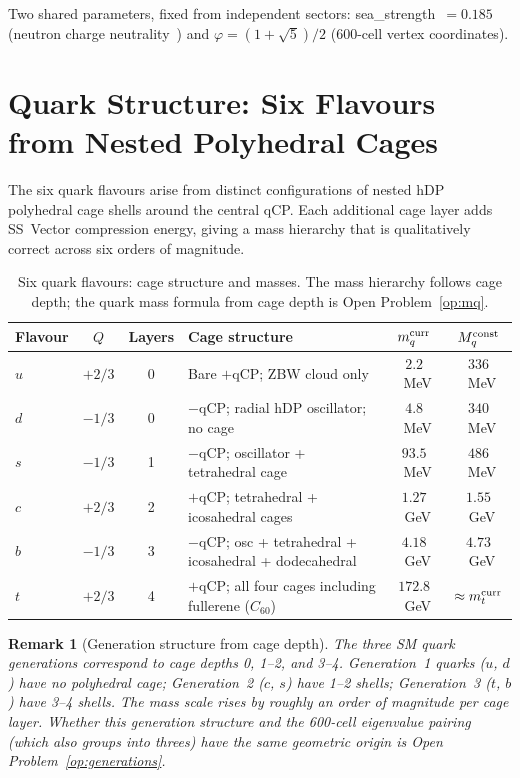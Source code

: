 \documentclass[11pt,a4paper]{article}
\newtheorem{remark}[theorem]{Remark}
\newcommand{\phig}{\varphi}
\begin{document}
Two shared parameters, fixed from independent sectors:
sea\_strength~$= 0.185$ (neutron charge neutrality~\citep{cpp5014})
and $\phig = (1+\sqrt5)/2$ (600-cell vertex coordinates).

\section{Quark Structure: Six Flavours from Nested Polyhedral Cages}
\label{sec:quarks}

The six quark flavours arise from distinct configurations of nested
hDP polyhedral cage shells around the central qCP.  Each additional
cage layer adds SS~Vector compression energy, giving a mass hierarchy
that is qualitatively correct across six orders of magnitude.

\begin{table}[H]
\centering
\caption{Six quark flavours: cage structure and masses.  The mass
  hierarchy follows cage depth; the quark mass formula from cage
  depth is Open Problem~\ref{op:mq}.}
\label{tab:quarks}
\begin{tabular}{@{}lccp{5.2cm}cc@{}}
\toprule
Flavour & $Q$ & Layers & Cage structure & $m_q^{\rm curr}$ & $M_q^{\rm const}$ \\
\midrule
$u$ & $+2/3$ & 0 & Bare $+$qCP; ZBW cloud only
  & $2.2$~MeV & $336$~MeV \\
$d$ & $-1/3$ & 0 & $-$qCP; radial hDP oscillator; no cage
  & $4.8$~MeV & $340$~MeV \\
$s$ & $-1/3$ & 1 & $-$qCP; oscillator + tetrahedral cage
  & $93.5$~MeV & $486$~MeV \\
$c$ & $+2/3$ & 2 & $+$qCP; tetrahedral + icosahedral cages
  & $1.27$~GeV & $1.55$~GeV \\
$b$ & $-1/3$ & 3 & $-$qCP; osc + tetrahedral + icosahedral + dodecahedral
  & $4.18$~GeV & $4.73$~GeV \\
$t$ & $+2/3$ & 4 & $+$qCP; all four cages including fullerene ($C_{60}$)
  & $172.8$~GeV & $\approx m_t^{\rm curr}$ \\
\bottomrule
\end{tabular}
\end{table}

\begin{remark}[Generation structure from cage depth]
The three SM quark generations correspond to cage depths 0, 1--2,
and 3--4.  Generation~1 quarks ($u$, $d$) have no polyhedral cage;
Generation~2 ($c$, $s$) have 1--2 shells; Generation~3 ($t$, $b$)
have 3--4 shells.  The mass scale rises by roughly an order of
magnitude per cage layer.  Whether this generation structure and the
600-cell eigenvalue pairing (which also groups into threes) have
the same geometric origin is Open Problem~\ref{op:generations}.
\end{remark}
\end{document}
